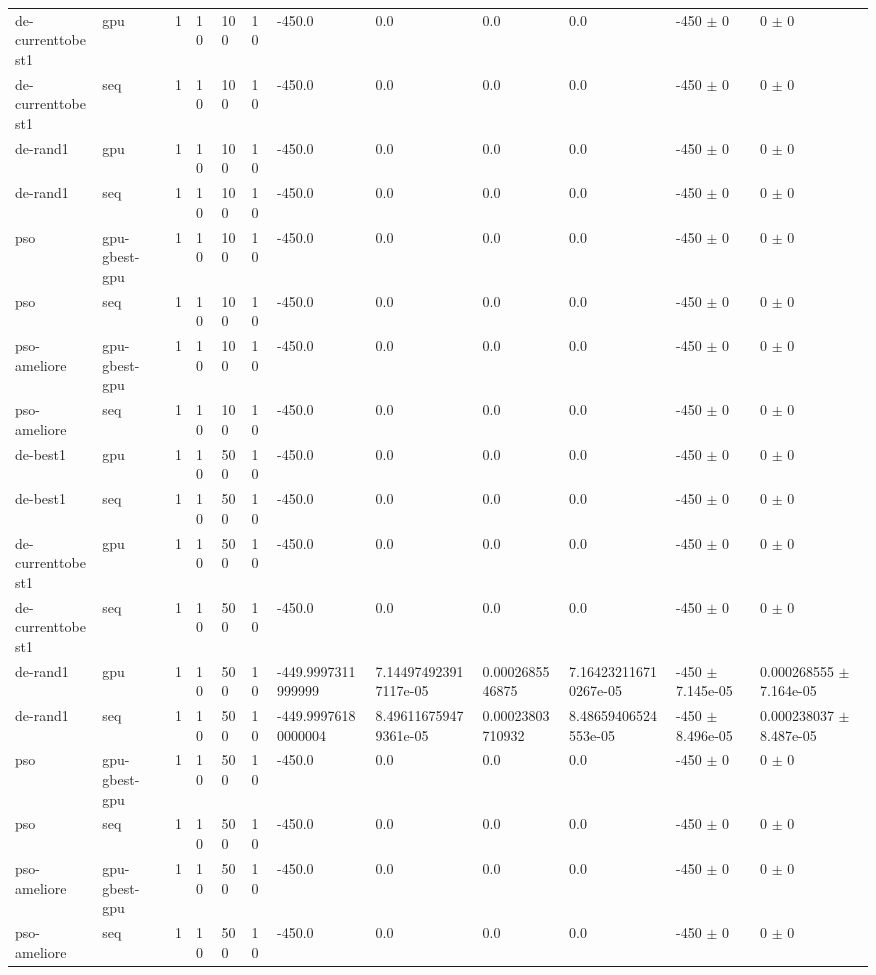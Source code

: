 \begin{table}[t]
\begin{tabular}{llllllllllll}
de-currenttobest1 & gpu & 1 & 10 & 100 & 10 & -450.0 & 0.0 & 0.0 & 0.0 & -450 $\pm$ 0 & 0 $\pm$ 0 \\
de-currenttobest1 & seq & 1 & 10 & 100 & 10 & -450.0 & 0.0 & 0.0 & 0.0 & -450 $\pm$ 0 & 0 $\pm$ 0 \\
de-rand1 & gpu & 1 & 10 & 100 & 10 & -450.0 & 0.0 & 0.0 & 0.0 & -450 $\pm$ 0 & 0 $\pm$ 0 \\
de-rand1 & seq & 1 & 10 & 100 & 10 & -450.0 & 0.0 & 0.0 & 0.0 & -450 $\pm$ 0 & 0 $\pm$ 0 \\
pso & gpu-gbest-gpu & 1 & 10 & 100 & 10 & -450.0 & 0.0 & 0.0 & 0.0 & -450 $\pm$ 0 & 0 $\pm$ 0 \\
pso & seq & 1 & 10 & 100 & 10 & -450.0 & 0.0 & 0.0 & 0.0 & -450 $\pm$ 0 & 0 $\pm$ 0 \\
pso-ameliore & gpu-gbest-gpu & 1 & 10 & 100 & 10 & -450.0 & 0.0 & 0.0 & 0.0 & -450 $\pm$ 0 & 0 $\pm$ 0 \\
pso-ameliore & seq & 1 & 10 & 100 & 10 & -450.0 & 0.0 & 0.0 & 0.0 & -450 $\pm$ 0 & 0 $\pm$ 0 \\
de-best1 & gpu & 1 & 10 & 500 & 10 & -450.0 & 0.0 & 0.0 & 0.0 & -450 $\pm$ 0 & 0 $\pm$ 0 \\
de-best1 & seq & 1 & 10 & 500 & 10 & -450.0 & 0.0 & 0.0 & 0.0 & -450 $\pm$ 0 & 0 $\pm$ 0 \\
de-currenttobest1 & gpu & 1 & 10 & 500 & 10 & -450.0 & 0.0 & 0.0 & 0.0 & -450 $\pm$ 0 & 0 $\pm$ 0 \\
de-currenttobest1 & seq & 1 & 10 & 500 & 10 & -450.0 & 0.0 & 0.0 & 0.0 & -450 $\pm$ 0 & 0 $\pm$ 0 \\
de-rand1 & gpu & 1 & 10 & 500 & 10 & -449.9997311999999 & 7.144974923917117e-05 & 0.0002685546875 & 7.164232116710267e-05 & -450 $\pm$ 7.145e-05 & 0.000268555 $\pm$ 7.164e-05 \\
de-rand1 & seq & 1 & 10 & 500 & 10 & -449.99976180000004 & 8.496116759479361e-05 & 0.00023803710932 & 8.48659406524553e-05 & -450 $\pm$ 8.496e-05 & 0.000238037 $\pm$ 8.487e-05 \\
pso & gpu-gbest-gpu & 1 & 10 & 500 & 10 & -450.0 & 0.0 & 0.0 & 0.0 & -450 $\pm$ 0 & 0 $\pm$ 0 \\
pso & seq & 1 & 10 & 500 & 10 & -450.0 & 0.0 & 0.0 & 0.0 & -450 $\pm$ 0 & 0 $\pm$ 0 \\
pso-ameliore & gpu-gbest-gpu & 1 & 10 & 500 & 10 & -450.0 & 0.0 & 0.0 & 0.0 & -450 $\pm$ 0 & 0 $\pm$ 0 \\
pso-ameliore & seq & 1 & 10 & 500 & 10 & -450.0 & 0.0 & 0.0 & 0.0 & -450 $\pm$ 0 & 0 $\pm$ 0 \\

\end{tabular}
\end{table}
